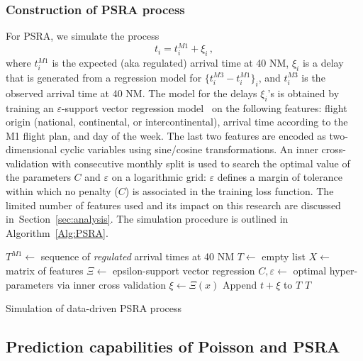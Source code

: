 \documentclass[]{elsarticle}
\begin{document}
\subsubsection{Construction of \acs{PSRA} process}\label{sec:dm_psra}

For \ac{PSRA}, we simulate the process
\begin{equation}
\label{eq:psra-like}
t_i = t^{M1}_i + \xi_i \,,
\end{equation}
where \(t^{M1}_i\) is the expected (aka regulated) arrival time at 40 NM, \(\xi_i\) is a delay that is generated from a regression model for \(\{t^{M3}_i - t^{M1}_i\}_i\), and \(t^{M3}_i\) is the observed arrival time at 40 NM.
The model for the delays \(\xi_i\)'s is obtained by training an \(\varepsilon\)-support vector regression model~\cite{cristianini2000introduction} on the following features: flight origin (national, continental, or intercontinental), arrival time according to the M1 flight plan, and day of the week.
The last two features are encoded as two-dimensional cyclic variables using sine/cosine transformations.
An inner cross-validation with consecutive monthly split is used to search the optimal value of the parameters \(C\) and \(\varepsilon\) on a logarithmic grid:
\(\varepsilon\) defines a margin of tolerance within which no penalty (\(C\)) is associated in the training loss function.
The limited number of features used and its impact on this research are discussed in~Section~\ref{sec:analysis}.
The simulation procedure is outlined in Algorithm~\ref{Alg:PSRA}.

\begin{algorithm}
\begin{algorithmic}[1]
    \STATE \(T^{M1} \leftarrow \) sequence of \emph{regulated} arrival times at 40 NM
    \STATE \(T \leftarrow \) empty list
    \STATE \(X \leftarrow \) matrix of features
    \STATE \(\Xi \leftarrow \) epsilon-support vector regression
    \STATE \(C, \varepsilon \leftarrow \) optimal hyper-parameters via inner cross validation
        \STATE \(\xi \leftarrow \Xi(x)\)
        \STATE Append \(t + \xi\) to \(T\)
    \ENDFOR
    \RETURN \(T\)
\end{algorithmic}
\caption{Simulation of data-driven PSRA process}\label{Alg:PSRA}
\end{algorithm}

\subsection{Prediction capabilities of Poisson and \acs{PSRA}}\label{sec:dm_comparison}
\end{document}

